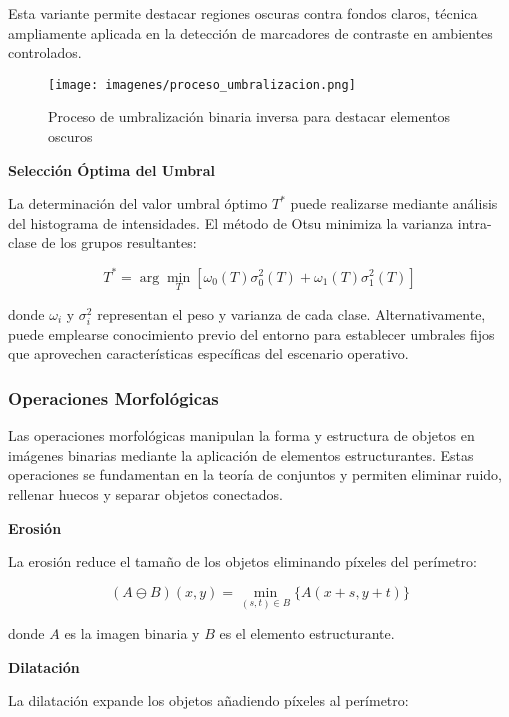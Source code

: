 Esta variante permite destacar regiones oscuras contra fondos claros, técnica ampliamente aplicada en la detección de marcadores de contraste en ambientes controlados.

\begin{figure}[h]
\centering
\texttt{[image: imagenes/proceso\_umbralizacion.png]}
\caption{Proceso de umbralización binaria inversa para destacar elementos oscuros}
\label{fig:umbralizacion}
\end{figure}

\textbf{Selección Óptima del Umbral}

La determinación del valor umbral óptimo $T^*$ puede realizarse mediante análisis del histograma de intensidades. El método de Otsu minimiza la varianza intra-clase de los grupos resultantes:

\begin{equation}
T^* = \arg\min_T \left[\omega_0(T)\sigma_0^2(T) + \omega_1(T)\sigma_1^2(T)\right]
\end{equation}

donde $\omega_i$ y $\sigma_i^2$ representan el peso y varianza de cada clase. Alternativamente, puede emplearse conocimiento previo del entorno para establecer umbrales fijos que aprovechen características específicas del escenario operativo.

\subsubsection{Operaciones Morfológicas}

Las operaciones morfológicas manipulan la forma y estructura de objetos en imágenes binarias mediante la aplicación de elementos estructurantes. Estas operaciones se fundamentan en la teoría de conjuntos y permiten eliminar ruido, rellenar huecos y separar objetos conectados.

\textbf{Erosión}

La erosión reduce el tamaño de los objetos eliminando píxeles del perímetro:

\begin{equation}
(A \ominus B)(x,y) = \min_{(s,t) \in B} \{A(x+s, y+t)\}
\end{equation}

donde $A$ es la imagen binaria y $B$ es el elemento estructurante.

\textbf{Dilatación}

La dilatación expande los objetos añadiendo píxeles al perímetro:

